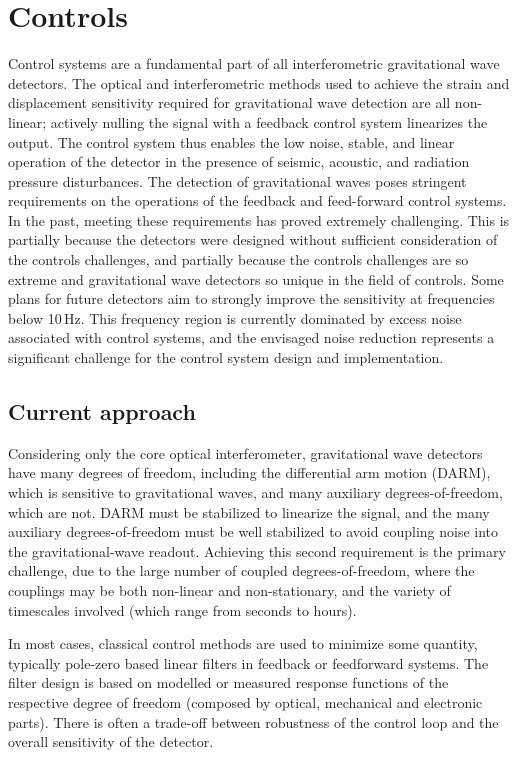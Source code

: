 \section{Controls}
\label{sec:Controls}
Control systems are a fundamental part of all interferometric gravitational wave detectors. The optical and interferometric methods used to achieve the strain and displacement sensitivity required for gravitational wave detection are all non-linear; actively nulling the signal with a feedback control system linearizes the output. The control system thus enables the low noise, stable, and linear operation of the detector in the presence of seismic, acoustic, and radiation pressure disturbances.
The detection of gravitational waves poses stringent requirements on the operations of the feedback and feed-forward control systems.
In the past, meeting these requirements has proved extremely challenging.
This is partially because the detectors were designed without sufficient consideration of the controls challenges, and partially because the controls challenges are so extreme and gravitational wave detectors so unique in the field of controls.
Some plans for future detectors aim to strongly improve the sensitivity at frequencies below 10\,Hz. This frequency region is currently dominated by excess noise associated with control systems, and the envisaged noise reduction represents a significant challenge for the control system design and implementation.

\subsection{Current approach}
Considering only the core optical interferometer, gravitational wave detectors have many degrees of freedom,  including the differential arm motion (DARM), which is sensitive to gravitational waves, and many auxiliary degrees-of-freedom, which are not. DARM must be stabilized to linearize the signal, and the many auxiliary degrees-of-freedom must be well stabilized to avoid coupling noise into the gravitational-wave readout. Achieving this second requirement is the primary challenge, due to the large number of coupled degrees-of-freedom, where the couplings may be both non-linear and non-stationary, and the variety of timescales involved (which range from seconds to hours).

In most cases, classical control methods are used to minimize some quantity, typically pole-zero based linear filters in feedback or feedforward systems.
The filter design is based on modelled or measured response functions of the respective degree of freedom (composed by optical, mechanical and electronic parts). There is often a trade-off between robustness of the control loop and the overall sensitivity of the detector.

